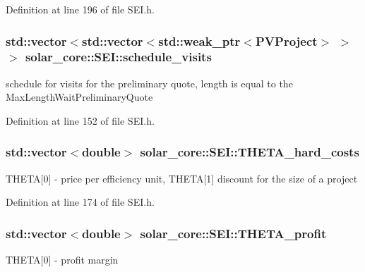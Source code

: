 Definition at line 196 of file S\+E\+I.\+h.

\hypertarget{classsolar__core_1_1_s_e_i_a8729d1aaf89da5d7d8b52761b65c881c}{}
\subsubsection[{schedule\+\_\+visits}]{\setlength{\rightskip}{0pt plus 5cm}std\+::vector$<$std\+::vector$<$std\+::weak\+\_\+ptr$<${\bf P\+V\+Project}$>$ $>$ $>$ solar\+\_\+core\+::\+S\+E\+I\+::schedule\+\_\+visits\hspace{0.3cm}{\ttfamily [protected]}}\label{classsolar__core_1_1_s_e_i_a8729d1aaf89da5d7d8b52761b65c881c}
schedule for visits for the preliminary quote, length is equal to the Max\+Length\+Wait\+Preliminary\+Quote 

Definition at line 152 of file S\+E\+I.\+h.

\hypertarget{classsolar__core_1_1_s_e_i_a4723f6d0e5098b9b2f553c9ef6c5545f}{}
\subsubsection[{T\+H\+E\+T\+A\+\_\+hard\+\_\+costs}]{\setlength{\rightskip}{0pt plus 5cm}std\+::vector$<$double$>$ solar\+\_\+core\+::\+S\+E\+I\+::\+T\+H\+E\+T\+A\+\_\+hard\+\_\+costs\hspace{0.3cm}{\ttfamily [protected]}}\label{classsolar__core_1_1_s_e_i_a4723f6d0e5098b9b2f553c9ef6c5545f}
T\+H\+E\+T\+A\mbox{[}0\mbox{]} -\/ price per efficiency unit, T\+H\+E\+T\+A\mbox{[}1\mbox{]} discount for the size of a project 

Definition at line 174 of file S\+E\+I.\+h.

\hypertarget{classsolar__core_1_1_s_e_i_a9137f81a58ab1325d8b37590afe267aa}{}
\subsubsection[{T\+H\+E\+T\+A\+\_\+profit}]{\setlength{\rightskip}{0pt plus 5cm}std\+::vector$<$double$>$ solar\+\_\+core\+::\+S\+E\+I\+::\+T\+H\+E\+T\+A\+\_\+profit\hspace{0.3cm}{\ttfamily [protected]}}\label{classsolar__core_1_1_s_e_i_a9137f81a58ab1325d8b37590afe267aa}
T\+H\+E\+T\+A\mbox{[}0\mbox{]} -\/ profit margin 

